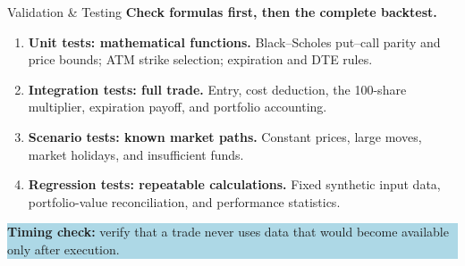 \documentclass[10pt,aspectratio=169]{beamer}
\newcommand{\softbox}[1]{\colorbox{LightBlue}{\parbox{0.93\linewidth}{\vspace{0.10cm}#1\vspace{0.10cm}}}}
\begin{document}
\begin{frame}{Validation \& Testing}
\vspace{0.10cm}
{\large\bfseries Check formulas first, then the complete backtest.}\par
\vspace{0.30cm}
\begin{enumerate}\setlength{\itemsep}{0.28cm}
\item \textbf{Unit tests: mathematical functions.} Black--Scholes put--call parity and price bounds; ATM strike selection; expiration and DTE rules.
\item \textbf{Integration tests: full trade.} Entry, cost deduction, the 100-share multiplier, expiration payoff, and portfolio accounting.
\item \textbf{Scenario tests: known market paths.} Constant prices, large moves, market holidays, and insufficient funds.
\item \textbf{Regression tests: repeatable calculations.} Fixed synthetic input data, portfolio-value reconciliation, and performance statistics.
\end{enumerate}
\vfill
\softbox{\small \textbf{Timing check:} verify that a trade never uses data that would become available only after execution.}
\end{frame}
\end{document}
